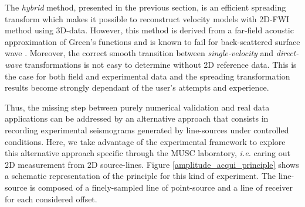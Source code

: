 \documentclass[manuscript,revised]{geophysics}
\begin{document}





\noindent The \textit{hybrid} method, presented in the previous section, is an efficient spreading transform which makes it possible to reconstruct velocity models with 2D-FWI method using 3D-data. However, this method is derived from a far-field acoustic approximation of Green's functions and is known to fail for back-scattered surface wave \citep{Schafer_LSS_2014}. Moreover, the correct smooth transition between \textit{single-velocity} and \textit{direct-wave} transformations is not easy to determine without 2D reference data. This is the case for both field and experimental data and the spreading transformation results become strongly dependant of the user's attempts and experience.
 
\noindent Thus, the missing step between purely numerical validation and real data applications can be addressed by an alternative approach that consists in recording experimental seismograms generated by line-sources under controlled conditions. Here, we take advantage of the experimental framework to explore this alternative approach specific through the MUSC laboratory, \textit{i.e.} caring out 2D measurement from 2D source-lines. Figure \ref{amplitude_acqui_principle} shows a schematic representation of the principle for this kind of experiment. The line-source is composed of a finely-sampled line of point-source and a line of receiver for each considered offset. 
 
\end{document}
